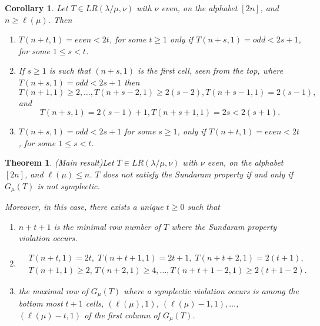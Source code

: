 \documentclass[10pt,a4paper]{amsart}
\newtheorem{cor}{Corollary}
\newtheorem{thm}{Theorem}
\begin{document}
\begin{cor} \label{cor:violation} Let $T\in LR(\lambda/\mu,\nu)$ with $\nu$ even, on the alphabet $[2n]$, and $n\ge \ell(\mu)$. Then
\begin{enumerate}
\item $T(n+t,1)=even< 2t$, for some $t\ge 1$  only if $T(n+s,1)=odd< 2s+1$, for some $1\le s<t$.

\item If $s\ge 1$ is such that $(n+s,1)$ is the first cell, seen from the top, where $T(n+s,1)=odd<2s+1$ then   $$T(n+1,1)\ge 2,\dots,T(n+s-2,1)\ge 2(s-2),  T(n+s-1,1)= 2(s-1),$$ 
    and $$T(n+s,1)=2(s-1)+1, T(n+s+1,1)=2s<2(s+1).$$

\item  $T(n+s,1)=odd< 2s+1$ for some $s\ge 1$, only if $T(n+t,1)=even< 2t$, for some  $1\le s<t$.
\end{enumerate}
\end{cor}

\begin{thm}(Main result)\label{th:main} Let $T\in LR(\lambda/\mu,\nu)$ with $\nu$ even, on the alphabet $[2n]$, and $ \ell(\mu)\le n$.
 $T$ does not satisfy the Sundaram property if and only if $G_\mu(T)$ is not symplectic.

Moreover,  in this case, there exists a unique $t\ge 0$ such that
\begin{enumerate}

\item  ${n+t+1}$  is  the minimal row number of $T$ where the  Sundaram property  violation occurs.

\item
  \begin{align}&T(n+t,1)=2t,\; T(n+t+1,1)= 2t+1,\; T(n+t+2,1)=2(t+1),\\
 &T(n+1,1)\ge 2,\, T(n+2,1)\ge 4,\dots, T(n+t+1-2,1)\ge 2(t+1-2).
 \end{align}
 \item  the maximal row    of $G_\mu(T)$ where a symplectic violation  occurs is among the bottom most $t+1$ cells,  $(\ell(\mu),1)$,  $(\ell(\mu)-1,1),\dots$,  $ (\ell(\mu)-t,1) $ of the first column of $G_\mu(T)$.
\end{enumerate}
\end{thm}
\end{document}
